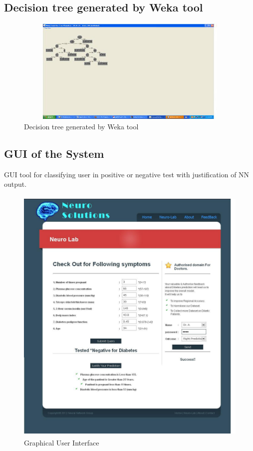 \documentclass[a4paper,14pt,onecolumn]{article}
\begin{document}
\subsection{Decision tree generated by Weka tool}
\begin{figure}[h!]
\begin{center}
\includegraphics[height=2in,width=5in]
{WekaDecTree.jpg} 
\caption{Decision tree generated by Weka tool}
\end{center}
\end{figure}

\subsection{GUI of the System}
GUI tool for classifying user in positive or negative test with justification of NN output.
\begin{figure}[h!]
\begin{center}
\includegraphics[height=5in,width=5in]
{GUI.jpg} 
\caption{Graphical User Interface}
\end{center}
\end{figure}
\end{document}
